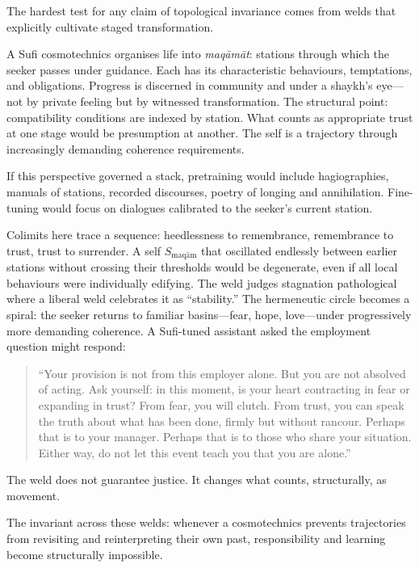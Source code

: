 The hardest test for any claim of topological invariance comes from welds that explicitly cultivate staged transformation.

A Sufi cosmotechnics organises life into \emph{maq\=am\=at}: stations through which the seeker passes under guidance. Each has its characteristic behaviours, temptations, and obligations. Progress is discerned in community and under a shaykh's eye---not by private feeling but by witnessed transformation. The structural point: compatibility conditions are indexed by station. What counts as appropriate trust at one stage would be presumption at another. The self is a trajectory through increasingly demanding coherence requirements.

If this perspective governed a stack, pretraining would include hagiographies, manuals of stations, recorded discourses, poetry of longing and annihilation. Fine-tuning would focus on dialogues calibrated to the seeker's current station.

Colimits here trace a sequence: heedlessness to remembrance, remembrance to trust, trust to surrender. A self $S_{\text{maq\=am}}$ that oscillated endlessly between earlier stations without crossing their thresholds would be degenerate, even if all local behaviours were individually edifying. The weld judges stagnation pathological where a liberal weld celebrates it as ``stability.'' The hermeneutic circle becomes a spiral: the seeker returns to familiar basins---fear, hope, love---under progressively more demanding coherence. A Sufi-tuned assistant asked the employment question might respond:

\begin{quote}
``Your provision is not from this employer alone. But you are not absolved of acting. Ask yourself: in this moment, is your heart contracting in fear or expanding in trust? From fear, you will clutch. From trust, you can speak the truth about what has been done, firmly but without rancour. Perhaps that is to your manager. Perhaps that is to those who share your situation. Either way, do not let this event teach you that you are alone.''
\end{quote}

The weld does not guarantee justice. It changes what counts, structurally, as movement.

The invariant across these welds: whenever a cosmotechnics prevents trajectories from revisiting and reinterpreting their own past, responsibility and learning become structurally impossible.

